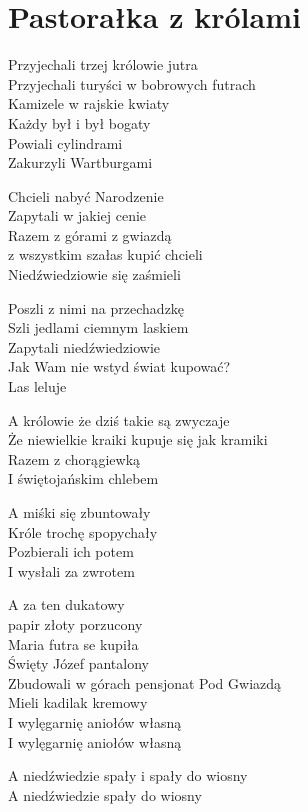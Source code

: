 \section{Pastorałka z królami}
\begin{text}
Przyjechali trzej królowie jutra\\
Przyjechali turyści w bobrowych futrach\\
Kamizele w rajskie kwiaty\\
Każdy był i był bogaty\\
Powiali cylindrami\\
Zakurzyli Wartburgami

Chcieli nabyć Narodzenie\\
Zapytali w jakiej cenie\\
Razem z górami z gwiazdą\\
z wszystkim szałas kupić chcieli\\
Niedźwiedziowie się zaśmieli

Poszli z nimi na przechadzkę\\
Szli jedlami ciemnym laskiem\\
Zapytali niedźwiedziowie\\
Jak Wam nie wstyd świat kupować?\\
Las leluje

A królowie że dziś takie są zwyczaje\\
Że niewielkie kraiki kupuje się jak kramiki\\
Razem z chorągiewką\\
I świętojańskim chlebem

A miśki się zbuntowały\\
Króle trochę spopychały\\
Pozbierali ich potem\\
I wysłali za zwrotem

A za ten dukatowy\\
papir złoty porzucony\\
Maria futra se kupiła\\
Święty Józef pantalony\\
Zbudowali w górach pensjonat Pod Gwiazdą\\
Mieli kadilak kremowy\\
I wylęgarnię aniołów własną\\
I wylęgarnię aniołów własną

A niedźwiedzie spały i spały do wiosny\\
A niedźwiedzie spały do wiosny
\end{text}